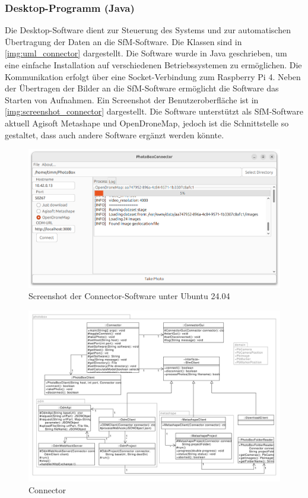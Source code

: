 \documentclass[./00PhotoBox.tex]{subfiles}
\begin{document}
\subsubsection{Desktop-Programm (Java)}
Die Desktop-Software dient zur Steuerung des Systems und zur automatischen Übertragung der Daten an die \gls{SfM}-Software. Die Klassen sind in \autoref{img:uml_connector} dargestellt. Die Software wurde in Java geschrieben, um eine einfache Installation auf verschiedenen Betriebssystemen zu ermöglichen. Die Kommunikation erfolgt über eine Socket-Verbindung zum Raspberry Pi 4. Neben der Übertragen der Bilder an die \gls{SfM}-Software ermöglicht die Software das Starten von Aufnahmen. Ein Screenshot der Benutzeroberfläche ist in \autoref{img:screenshot_connector} dargestellt. Die Software unterstützt als \gls{SfM}-Software aktuell Agisoft Metashape und OpenDroneMap, jedoch ist die Schnittstelle so gestaltet, dass auch andere Software ergänzt werden könnte.


\begin{figure}
    \centering
    \includegraphics[width=1\textwidth]{./img/connector_screenshot.png}
    \caption{Screenshot der Connector-Software unter Ubuntu 24.04} %
    \label{img:screenshot_connector} %
\end{figure}

\begin{figure}
    \centering
    \includegraphics[width=1\textwidth]{./img/uml/uml_connector_classdiagramm.pdf}
    \caption{Connector} %
    \label{img:uml_connector} %
\end{figure}

\biblio
\end{document}
